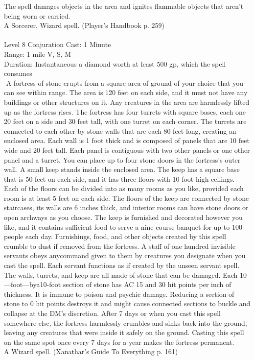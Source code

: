 \documentclass[10pt,twocolumn]{report}
\begin{document}
The spell damages objects in the area and ignites flammable objects that aren’t being worn or carried.\\
A Sorcerer, Wizard spell. (Player's Handbook p. 259) \\


 \\
Level 8 \quad Conjuration \quad Cast: 1 Minute\\
Range: 1 mile \quad V, S, M\\
Duration: Instantaneous \quad a diamond worth at least 500 gp, which the spell consumes\\
-A fortress of stone erupts from a square area of ground of your choice that you can see within range. The area is 120 feet on each side, and it must not have any buildings or other structures on it. Any creatures in the area are harmlessly lifted up as the fortress rises.
The fortress has four turrets with square bases, each one 20 feet on a side and 30 feet tall, with one turret on each corner. The turrets are connected to each other by stone walls that are each 80 feet long, creating an enclosed area. Each wall is 1 foot thick and is composed of panels that are 10 feet wide and 20 feet tall. Each panel is contiguous with two other panels or one other panel and a turret. You can place up to four stone doors in the fortress’s outer wall.
A small keep stands inside the enclosed area. The keep has a square base that is 50 feet on each side, and it has three floors with 10-foot-high ceilings. Each of the floors can be divided into as many rooms as you like, provided each room is at least 5 feet on each side. The floors of the keep are connected by stone staircases, its walls are 6 inches thick, and interior rooms can have stone doors or open archways as you choose. The keep is furnished and decorated however you like, and it contains sufficient food to serve a nine-course banquet for up to 100 people each day. Furnishings, food, and other objects created by this spell crumble to dust if removed from the fortress.
A staff of one hundred invisible servants obeys anycommand given to them by creatures you designate when you cast the spell. Each servant functions as if created by the unseen servant spell.
The walls, turrets, and keep are all made of stone that can be damaged. Each 10—foot—bya10-foot section of stone has AC 15 and 30 hit points per inch of thickness. It is immune to poison and psychic damage. Reducing a section of stone to 0 hit points destroys it and might cause connected sections to buckle and collapse at the DM’s discretion.
After 7 days or when you cast this spell somewhere else, the fortress harmlessly crumbles and sinks back into the ground, leaving any creatures that were inside it safely on the ground.
Casting this spell on the same spot once every 7 days for a year makes the fortress permanent.\\
A Wizard spell. (Xanathar's Guide To Everything p. 161) \\
\end{document}
